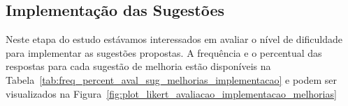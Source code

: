 \begin{table}[htpb]
\centering
{}
\caption{Ranking das sugestões propostas}
\label{tab:ranking-sugestoes-melhorias}
\end{table}

\subsection{Implementação das Sugestões}
\label{sub:sug_melhorias_resultados_implementacao}

Neste etapa do estudo estávamos interessados em avaliar o nível de dificuldade
para implementar as sugestões propostas. A frequência e o percentual das
respostas para cada sugestão de melhoria estão disponíveis na
Tabela~\ref{tab:freq_percent_aval_sug_melhorias_implementacao} e podem ser
visualizados na Figura~\ref{fig:plot_likert_avaliacao_implementacao_melhorias}

